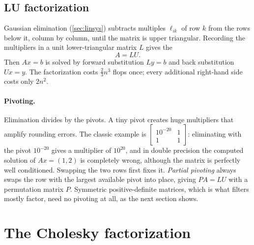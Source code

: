 \subsection{LU factorization}

Gaussian elimination (\cref{sec:linsys}) subtracts multiples $\ell_{ik}$ of row $k$ from the rows below it, column by column, until
the matrix is upper triangular. Recording the multipliers in a unit lower-triangular matrix $L$ gives the 
\begin{equation}
  A = LU .
\end{equation}
Then $Ax = b$ is solved by forward substitution $Ly = b$ and back substitution $Ux = y$. The factorization costs $\tfrac23n^3$ flops
once; every additional right-hand side costs only $2n^2$.

\paragraph{Pivoting.} Elimination divides by the pivots. A tiny pivot creates huge multipliers that amplify rounding errors.
The classic example is $\begin{bmatrix}10^{-20} & 1\\ 1 & 1\end{bmatrix}$: eliminating with the pivot $10^{-20}$ gives a multiplier
of $10^{20}$, and in double precision the computed solution of $Ax = (1, 2)$ is completely wrong, although the matrix is
perfectly well conditioned. Swapping the two rows first fixes it. \emph{Partial pivoting} always swaps the row with the largest
available pivot into place, giving $PA = LU$ with a permutation matrix $P$. Symmetric positive-definite matrices, which is
what filters mostly factor, need no pivoting at all, as the next section shows.

\section{The Cholesky factorization}

